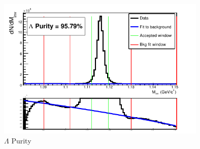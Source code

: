 \begin{figure}[h]
  \centering
  \includegraphics[width=100mm]{3_DataSelection/Figures/LamPurity_LamK0.pdf}
  \caption[$\Lambda$ Purity]{$\Lambda$ Purity}
  \label{fig:LamPurity}
\end{figure}